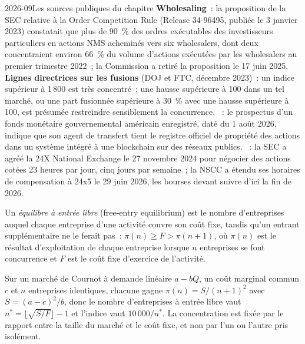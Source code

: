 \begin{dated}{2026-09}{Les sources publiques du chapitre}\label{dat:fm:competition-and-the-future:record}
\textbf{Wholesaling}~: la proposition de la SEC relative à la Order Competition Rule (Release 34-96495, publiée le 3 janvier 2023) constatait que plus de 90~\% des ordres exécutables des
investisseurs particuliers en actions NMS acheminés vers six wholesalers, dont deux concentraient environ 66~\% du volume d'actions exécutées par les wholesalers au premier
trimestre 2022~; la Commission a retiré la proposition le 17 juin 2025. \textbf{Lignes directrices sur les fusions} (DOJ et FTC, décembre 2023)~: un indice supérieur à 1\,800 est
très concentré~; une hausse supérieure à 100 dans un tel marché, ou une part fusionnée supérieure à 30~\% avec une hausse supérieure à 100, est présumée restreindre
sensiblement la concurrence. \textbf{}~: le prospectus d'un fonds monétaire gouvernemental américain enregistré, daté du 1 août 2026, indique que son
agent de transfert tient le registre officiel de propriété des actions dans un système intégré à une blockchain sur des réseaux publics. \textbf{}~: la SEC
a agréé la 24X National Exchange le 27 novembre 2024 pour négocier des actions cotées 23 heures par jour, cinq jours par semaine~; la NSCC a étendu ses horaires de compensation à
24x5 le 29 juin 2026, les bourses devant suivre d'ici la fin de 2026.
\end{dated}

\begin{definition}\label{def:fm:competition-and-the-future:freeentry}
Un \emph{équilibre à entrée libre} (free-entry equilibrium) est le nombre d'entreprises auquel chaque entreprise d'une activité couvre son coût fixe, tandis qu'un
entrant supplémentaire ne le ferait pas~: $\pi(n)\ge F>\pi(n+1)$, où $\pi(n)$ est le résultat d'exploitation de chaque entreprise lorsque $n$ entreprises se font concurrence et $F$ est le coût fixe
d'exercice de l'activité.
\end{definition}

Sur un marché de Cournot à demande linéaire $a-bQ$, un coût marginal commun $c$ et $n$ entreprises identiques, chacune gagne $\pi(n)=S/(n+1)^2$ avec
$S=(a-c)^2/b$, donc le nombre d'entreprises à entrée libre vaut $n^*=\lfloor\sqrt{S/F}\rfloor-1$ et l'indice vaut $10\,000/n^*$. La concentration est fixée par le rapport entre la taille du
marché et le coût fixe, et non par l'un ou l'autre pris isolément.

